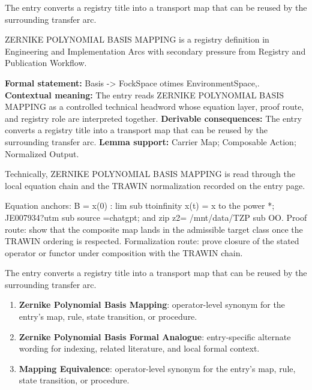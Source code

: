 The entry converts a registry title into a transport map that can be reused by the surrounding transfer arc.
\clearpage


\begingroup\small
{}
ZERNIKE POLYNOMIAL BASIS MAPPING is a registry definition in Engineering and Implementation Arcs with secondary pressure from Registry and Publication Workflow.

\begingroup\footnotesize\setlength{\emergencystretch}{3em}\sloppy
\textbf{Formal statement:} Basis -> FockSpace otimes EnvironmentSpace,. \textbf{Contextual meaning:} The entry reads ZERNIKE POLYNOMIAL BASIS MAPPING as a controlled technical headword whose equation layer, proof route, and registry role are interpreted together. \textbf{Derivable consequences:} The entry converts a registry title into a transport map that can be reused by the surrounding transfer arc. \textbf{Lemma support:} Carrier Map; Composable Action; Normalized Output.\par
\endgroup

Technically, ZERNIKE POLYNOMIAL BASIS MAPPING is read through the local equation chain and the TRAWIN normalization recorded on the entry page.

Equation anchors: B = x(0) : lim sub ttoinfinity x(t) = x to the power *; JE007934?utm sub source =chatgpt; and zip z2= /mnt/data/TZP sub OO. Proof route: show that the composite map lands in the admissible target class once the TRAWIN ordering is respected. Formalization route: prove closure of the stated operator or functor under composition with the TRAWIN chain.

The entry converts a registry title into a transport map that can be reused by the surrounding transfer arc.
\endgroup

\begin{enumerate}[leftmargin=1.6em,itemsep=6pt,topsep=4pt]
\item \textbf{Zernike Polynomial Basis Mapping}: operator-level synonym for the entry's map, rule, state transition, or procedure.
\item \textbf{Zernike Polynomial Basis Formal Analogue}: entry-specific alternate wording for indexing, related literature, and local formal context.
\item \textbf{Mapping Equivalence}: operator-level synonym for the entry's map, rule, state transition, or procedure.
\end{enumerate}

